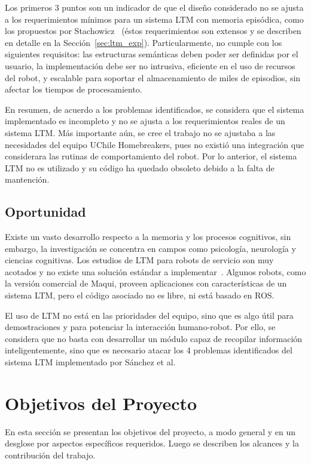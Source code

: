 Los primeros 3 puntos son un indicador de que el diseño considerado no se ajusta a los requerimientos mínimos para un sistema LTM con memoria episódica, como los propuestos por Stachowicz~\cite{Stachowicz2012} (éstos requerimientos son extensos y se describen en detalle en la Sección~\ref{sec:ltm_exp}). Particularmente, no cumple con los siguientes requisitos: las estructuras semánticas deben poder ser definidas por el usuario, la implementación debe ser no intrusiva, eficiente en el uso de recursos del robot, y escalable para soportar el almacenamiento de miles de episodios, sin afectar los tiempos de procesamiento.

En resumen, de acuerdo a los problemas identificados, se considera que el sistema implementado es incompleto y no se ajusta a los requerimientos reales de un sistema LTM. Más importante aún, se cree el trabajo no se ajustaba a las necesidades del equipo UChile Homebreakers, pues no existió una integración que considerara las rutinas de comportamiento del robot. Por lo anterior, el sistema LTM no es utilizado y su código ha quedado obsoleto debido a la falta de mantención.

\subsection{Oportunidad}

Existe un vasto desarrollo respecto a la memoria y los procesos cognitivos, sin embargo, la investigación se concentra en campos como psicología, neurología y ciencias cognitivas. Los estudios de LTM para robots de servicio son muy acotados y no existe una solución estándar a implementar~\cite{ltm_in_robocup}. Algunos robots, como la versión comercial de Maqui, proveen aplicaciones con características de un sistema LTM, pero el código asociado no es libre, ni está basado en ROS.

El uso de LTM no está en las prioridades del equipo, sino que es algo útil para demostraciones y para potenciar la interacción humano-robot. Por ello, se considera que no basta con desarrollar un módulo capaz de recopilar información inteligentemente, sino que es necesario atacar los 4 problemas identificados del sistema LTM implementado por Sánchez et al.


\section{Objetivos del Proyecto}\label{sec:objetivos}

En esta sección se presentan los objetivos del proyecto, a modo general y en un desglose por aspectos específicos requeridos. Luego se describen los alcances y la contribución del trabajo. 

